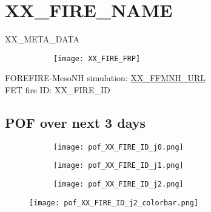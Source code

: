 \newpage
\vspace{-1em}
\section*{XX_FIRE_NAME}
\label{sec:fireIDXX_FIRE_ID}
\vspace{-1em}
\parbox{\linewidth}{\small{ XX_META_DATA}}
\begin{figure}[H]
    \centering
    \begin{subfigure}[b]{0.3\textwidth}
        \centering
    \end{subfigure}
    \begin{subfigure}[b]{0.69\textwidth}
        \centering
         \texttt{[image: XX\_FIRE\_FRP]}
    \end{subfigure}
\end{figure}
\vspace{-2em}
\noindent
\small{ FOREFIRE-MesoNH simulation:  \url{XX_FFMNH_URL} }\\
\small{ FET fire ID: XX_FIRE_ID }
\vspace{-1em}
\subsection*{POF over next 3 days}
\vspace{-1em}
\begin{figure}[H]
    \raggedright  %
    \begin{minipage}{\textwidth}
        \begin{minipage}[t]{0.96\textwidth} %
            \begin{subfigure}[b]{0.32\textwidth}
                \centering
                \texttt{[image: pof\_XX\_FIRE\_ID\_j0.png]}
            \end{subfigure}
            \begin{subfigure}[b]{0.32\textwidth}
                \centering
                \texttt{[image: pof\_XX\_FIRE\_ID\_j1.png]}
            \end{subfigure}
            \begin{subfigure}[b]{0.32\textwidth}
                \centering
                \texttt{[image: pof\_XX\_FIRE\_ID\_j2.png]}
            \end{subfigure}
        \end{minipage}%
        \begin{minipage}[t]{0.0384\textwidth}
            \raggedright
            \texttt{[image: pof\_XX\_FIRE\_ID\_j2\_colorbar.png]}
        \end{minipage}
    \end{minipage}

\end{figure}


